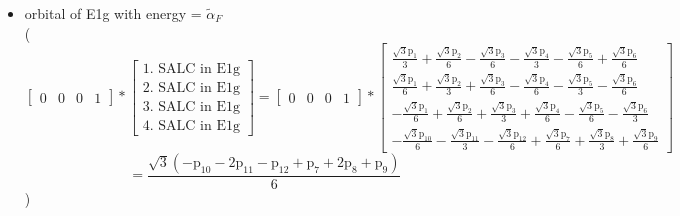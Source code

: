 \documentclass[12pt,a4paper]{article}
\begin{document}
\begin{itemize}
\textcolor{red}{Error in Orthogonalization of SALCs}\textcolor{red}{Error in Orthogonalization of SALCs}\textcolor{red}{Error in Orthogonalization of SALCs}\item orbital of E1g with energy = 
                                $\tilde{\alpha}_{F}$ \\
( 
$$
\left[\begin{matrix}0 & 0 & 0 & 1\end{matrix}\right] * \left[\begin{array}{c}\text{1. SALC in E1g} \\ \text{2. SALC in E1g} \\ \text{3. SALC in E1g} \\ \text{4. SALC in E1g}\end{array}\right] = \left[\begin{matrix}0 & 0 & 0 & 1\end{matrix}\right] * \left[\begin{matrix}\frac{\sqrt{3} \text{p}_{1}}{3} + \frac{\sqrt{3} \text{p}_{2}}{6} - \frac{\sqrt{3} \text{p}_{3}}{6} - \frac{\sqrt{3} \text{p}_{4}}{3} - \frac{\sqrt{3} \text{p}_{5}}{6} + \frac{\sqrt{3} \text{p}_{6}}{6}\\\frac{\sqrt{3} \text{p}_{1}}{6} + \frac{\sqrt{3} \text{p}_{2}}{3} + \frac{\sqrt{3} \text{p}_{3}}{6} - \frac{\sqrt{3} \text{p}_{4}}{6} - \frac{\sqrt{3} \text{p}_{5}}{3} - \frac{\sqrt{3} \text{p}_{6}}{6}\\- \frac{\sqrt{3} \text{p}_{1}}{6} + \frac{\sqrt{3} \text{p}_{2}}{6} + \frac{\sqrt{3} \text{p}_{3}}{3} + \frac{\sqrt{3} \text{p}_{4}}{6} - \frac{\sqrt{3} \text{p}_{5}}{6} - \frac{\sqrt{3} \text{p}_{6}}{3}\\- \frac{\sqrt{3} \text{p}_{10}}{6} - \frac{\sqrt{3} \text{p}_{11}}{3} - \frac{\sqrt{3} \text{p}_{12}}{6} + \frac{\sqrt{3} \text{p}_{7}}{6} + \frac{\sqrt{3} \text{p}_{8}}{3} + \frac{\sqrt{3} \text{p}_{9}}{6}\end{matrix}\right] 
 $$ $$ = \frac{\sqrt{3} \left(- \text{p}_{10} - 2 \text{p}_{11} - \text{p}_{12} + \text{p}_{7} + 2 \text{p}_{8} + \text{p}_{9}\right)}{6} 
 $$ 
 )


\end{itemize}
\end{document}
